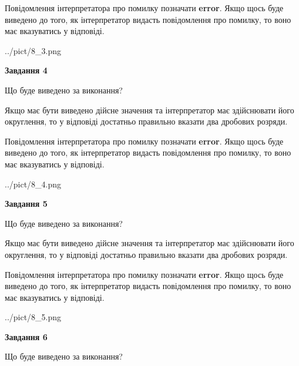 \documentclass[12pt, ukrainian]{article}
\begin{document}
{\begin {Large}
Повідомлення інтерпретатора про помилку позначати \textbf{error}.
Якщо щось буде виведено до того, як інтерпретатор видасть повідомлення про помилку, 
то воно має вказуватись у відповіді. \par

\begin{center}
	{../pict/8_3.png}
\end{center}
\newpage

{\begin {center}\textbf{Завдання 4}\end {center}}\par
Що буде виведено за виконання? \par

Якщо має бути виведено дійсне значення та інтерпретатор має здійснювати його округлення, 
то у відповіді достатньо правильно вказати два дробових розряди.

Повідомлення інтерпретатора про помилку позначати \textbf{error}.
Якщо щось буде виведено до того, як інтерпретатор видасть повідомлення про помилку, 
то воно має вказуватись у відповіді. \par

\begin{center}
	{../pict/8_4.png}
\end{center}
\newpage

{\begin {center}\textbf{Завдання 5}\end {center}}\par
Що буде виведено за виконання? \par

Якщо має бути виведено дійсне значення та інтерпретатор має здійснювати його округлення, 
то у відповіді достатньо правильно вказати два дробових розряди.

Повідомлення інтерпретатора про помилку позначати \textbf{error}.
Якщо щось буде виведено до того, як інтерпретатор видасть повідомлення про помилку, 
то воно має вказуватись у відповіді. \par

\begin{center}
	{../pict/8_5.png}
\end{center}
\newpage

{\begin {center}\textbf{Завдання 6}\end {center}}\par
Що буде виведено за виконання? \par


\end{Large}}
\end{document}
